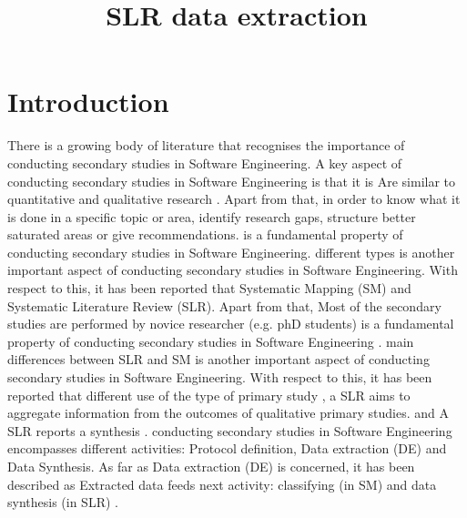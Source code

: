 \documentclass{article}
\title{SLR data extraction}
\author{}
\begin{document}
\maketitle
      

\section{Introduction}

There is a growing body of literature that recognises the importance of conducting secondary studies in Software Engineering. A key aspect of conducting secondary studies in Software Engineering is that it is Are similar to quantitative and qualitative research \cite{Wohlin2013}. Apart from that, in order to know what it is done in a specific topic or area, identify research gaps, structure better saturated areas or give recommendations. is a fundamental property of conducting secondary studies in Software Engineering. different types is another important aspect of conducting secondary studies in Software Engineering. With respect to this, it has been reported that Systematic Mapping (SM) and Systematic Literature Review (SLR). Apart from that, Most of the secondary studies are performed by novice researcher (e.g. phD students) is a fundamental property of conducting secondary studies in Software Engineering \cite{Carver2013}. main differences between SLR and SM is another important aspect of conducting secondary studies in Software Engineering. With respect to this, it has been reported that different use of the type of primary study \cite{Kitchenham2015}, a SLR aims to aggregate information from the outcomes of qualitative primary studies. \cite{Kitchenham2015} and A SLR reports a synthesis \cite{Wohlin2013}. conducting secondary studies in Software Engineering encompasses different activities: Protocol definition, Data extraction (DE) and Data Synthesis. As far as Data extraction (DE) is concerned, it has been described as Extracted data feeds next activity: classifying (in SM) and data synthesis (in SLR) \cite{Garousi2017}. 
    
\end{document}
